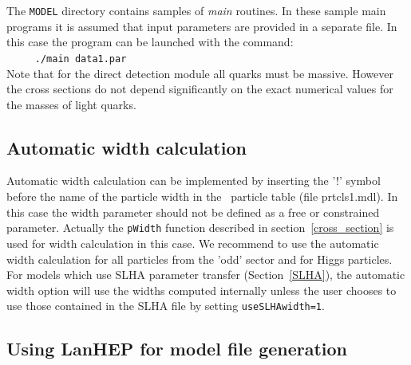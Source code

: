 \documentclass[12pt,a4paper]{article}
\begin{document}
The {\tt MODEL} directory contains  samples of {\it main}
routines. In these sample main programs it is assumed that input parameters are provided in a separate
file. In this case the  program can be launched with the command:\\
\verb|     ./main data1.par|\\
Note that for the direct detection module all quarks must be  massive. 
However the cross sections do not depend significantly on the exact  
numerical values for the masses of light quarks.

 
\subsection{Automatic width calculation}
Automatic width calculation can be 
implemented by  inserting the '!' symbol before the name of the particle width  in 
the \calchep\ particle table (file prtcls1.mdl). In this case the width parameter 
should not be defined as a free or constrained parameter. 
Actually the \verb|pWidth| function  described in section~\ref{cross_section} is  used for width calculation in this case.
We recommend to use the
automatic width calculation for all particles from the 'odd' sector and for
Higgs particles. 
For models which use SLHA parameter transfer (Section~\ref{SLHA}), 
the automatic width option will use the widths computed internally unless the user chooses to use those contained  in the SLHA file  by setting {\tt useSLHAwidth=1}. 


\subsection{Using LanHEP for model file generation}
\end{document}
